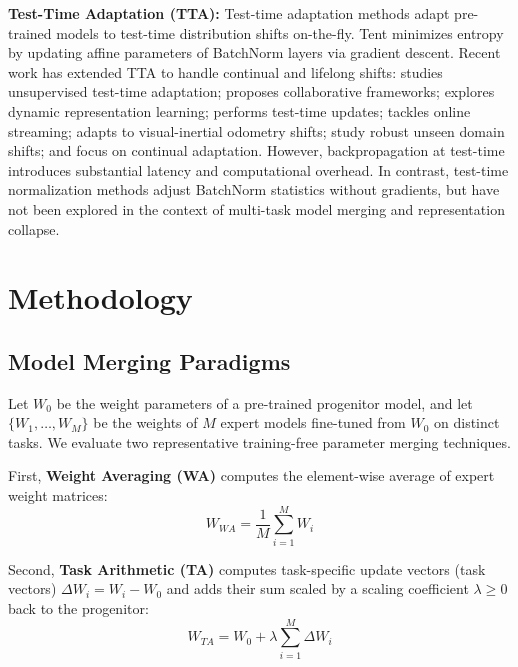 \documentclass{article}
\theoremstyle{plain}
\theoremstyle{definition}
\theoremstyle{remark}
\begin{document}
\textbf{Test-Time Adaptation (TTA):} Test-time adaptation methods adapt pre-trained models to test-time distribution shifts on-the-fly. Tent \cite{wang2020tent} minimizes entropy by updating affine parameters of BatchNorm layers via gradient descent. Recent work has extended TTA to handle continual and lifelong shifts: \cite{vianna2025unsuperv} studies unsupervised test-time adaptation; \cite{zhao2025cfta} proposes collaborative frameworks; \cite{wang2025drtta} explores dynamic representation learning; \cite{mehrbod2025test} performs test-time updates; \cite{su2023towards} tackles online streaming; \cite{park2024ulvio} adapts to visual-inertial odometry shifts; \cite{yazdanpanah2026revisiti, bahri2025smartpc, zhang2022unseen} study robust unseen domain shifts; and \cite{li2025continua, vianna2024generali, karmanov2024efficien, niu2023towards, kim2025battling, guo2025smoothin} focus on continual adaptation. However, backpropagation at test-time introduces substantial latency and computational overhead. In contrast, test-time normalization methods \cite{nado2020evaluating} adjust BatchNorm statistics without gradients, but have not been explored in the context of multi-task model merging and representation collapse.

\section{Methodology}
\label{methodology}

\subsection{Model Merging Paradigms}
Let $W_0$ be the weight parameters of a pre-trained progenitor model, and let $\{W_1, \dots, W_M\}$ be the weights of $M$ expert models fine-tuned from $W_0$ on distinct tasks. We evaluate two representative training-free parameter merging techniques.

First, \textbf{Weight Averaging (WA)} computes the element-wise average of expert weight matrices:
\begin{equation}
  W_{WA} = \frac{1}{M} \sum_{i=1}^M W_i
\end{equation}

Second, \textbf{Task Arithmetic (TA)} computes task-specific update vectors (task vectors) $\Delta W_i = W_i - W_0$ and adds their sum scaled by a scaling coefficient $\lambda \ge 0$ back to the progenitor:
\begin{equation}
  W_{TA} = W_0 + \lambda \sum_{i=1}^M \Delta W_i
\end{equation}
\end{document}
